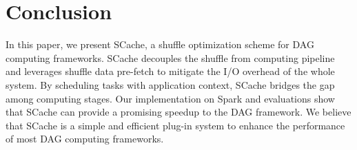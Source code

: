 \section{Conclusion}
 In this paper, we present SCache, a shuffle optimization scheme for DAG computing frameworks. SCache decouples the shuffle from computing pipeline and leverages shuffle data pre-fetch to mitigate the I/O overhead of the whole system. By scheduling tasks with application context, SCache bridges the gap among computing stages. Our implementation on Spark and evaluations show that SCache can provide a promising speedup to the DAG framework. We believe that SCache is a simple and efficient plug-in system to enhance the performance of most DAG computing frameworks. 